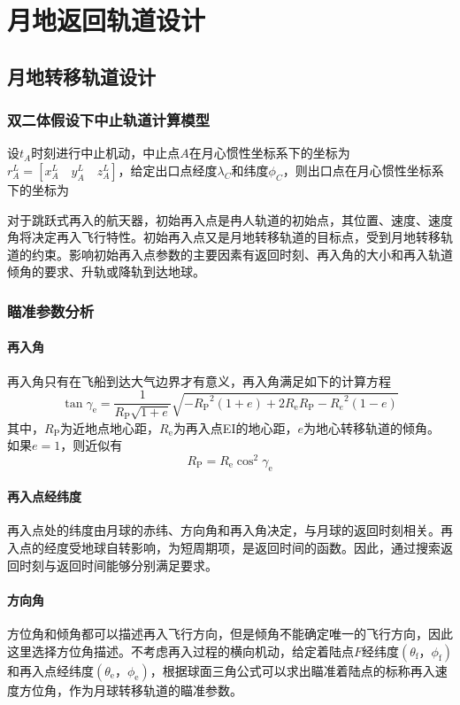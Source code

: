 \chapter{月地返回轨道设计}
\section{月地转移轨道设计}
\subsection{双二体假设下中止轨道计算模型}

设$t_A$时刻进行中止机动，中止点$A$在月心惯性坐标系下的坐标为$r_A^L=[x_A^L\quad y_A^L\quad z_A^L]$，给定出口点经度$\lambda_C$和纬度$\phi_C$，则出口点在月心惯性坐标系下的坐标为

对于跳跃式再入的航天器，初始再入点是冉人轨道的初始点，其位置、速度、速度角将决定再入飞行特性。初始再入点又是月地转移轨道的目标点，受到月地转移轨道的约束。影响初始再入点参数的主要因素有返回时刻、再入角的大小和再入轨道倾角的要求、升轨或降轨到达地球。


\subsection{瞄准参数分析}
\subsubsection{再入角}
再入角只有在飞船到达大气边界才有意义，再入角满足如下的计算方程
\begin{equation}
	\tan \gamma_\mathrm{e}=\frac{1}{R_\mathrm{P}\sqrt{1+e}}\sqrt{-{R_\mathrm{P}}^2(1+e)+2R_\mathrm{e}R_\mathrm{P}-{R_e}^2(1-e)}
\end{equation}
其中，$R_\mathrm{P}$为近地点地心距，$R_\mathrm{e}$为再入点EI的地心距，$e$为地心转移轨道的倾角。
如果$e=1$，则近似有
\begin{equation}
	R_{\mathrm P}=R_{\mathrm{e}}\cos^2\gamma_{\mathrm{e}}
\end{equation}
\subsubsection{再入点经纬度}
再入点处的纬度由月球的赤纬、方向角和再入角决定，与月球的返回时刻相关。再入点的经度受地球自转影响，为短周期项，是返回时间的函数。因此，通过搜索返回时刻与返回时间能够分别满足要求。
\subsubsection{方向角}
方位角和倾角都可以描述再入飞行方向，但是倾角不能确定唯一的飞行方向，因此这里选择方位角描述。不考虑再入过程的横向机动，给定着陆点$F$经纬度$(\theta_{\mathrm f}，\phi_{\mathrm f})$和再入点经纬度$(\theta_{\mathrm e}，\phi_{\mathrm e})$，根据球面三角公式可以求出瞄准着陆点的标称再入速度方位角，作为月球转移轨道的瞄准参数。

